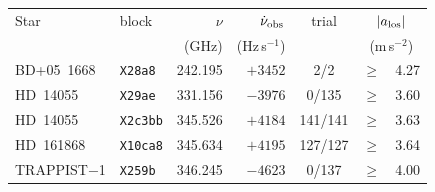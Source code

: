 \begin{tabular}{@{}llr@{~}r@{~}c@{~}r@{~}l@{}}
\hline
Star & block & $\nu$ & $\dot\nu_{\rm obs}$ & trial & \multicolumn{2}{c}{$|a_{\rm los}|$} \\
 & & (GHz) & (Hz\,s$^{-1}$) & & \multicolumn{2}{c}{(m\,s$^{-2}$)} \\
\hline
BD+05~1668 & \texttt{X28a8} & 242.195 & $+3452$ & 2/2 & $\ge$ & 4.27 \\
HD~14055 & \texttt{X29ae} & 331.156 & $-3976$ & 0/135 & $\ge$ & 3.60 \\
HD~14055 & \texttt{X2c3bb} & 345.526 & $+4184$ & 141/141 & $\ge$ & 3.63 \\
HD~161868 & \texttt{X10ca8} & 345.634 & $+4195$ & 127/127 & $\ge$ & 3.64 \\
TRAPPIST$-$1 & \texttt{X259b} & 346.245 & $-4623$ & 0/137 & $\ge$ & 4.00 \\
\hline
\end{tabular}
